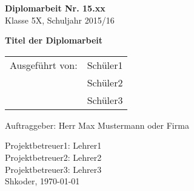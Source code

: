 
\newcommand{\trtitle}{Titel der Diplomarbeit}
\newcommand{\trort}{Shkoder}
\newcommand{\trbetreuer}{Titel Betreuer}
\newcommand{\trfachgebiet}{SEW, INSY, NWTK, ...}
\newcommand{\trdate}{\today}
\newcommand{\trnumber}{15.xx}
\newcommand{\trclass}{5X}
\newcommand{\trschuelereins}{Sch\"uler1}
\newcommand{\trschuelerzwei}{Sch\"uler2}
\newcommand{\trschuelerdrei}{Sch\"uler3}
\newcommand{\trsauftraggeber}{Herr Max Mustermann oder Firma}
\newcommand{\trbetreuereins}{Lehrer1}
\newcommand{\trbetreuerzwei}{Lehrer2}
\newcommand{\trbetreuerdrei}{Lehrer3}

\thispagestyle{empty}

\vspace{2.5cm}
\begin{flushleft}
\textbf{\LARGE Diplomarbeit Nr. \trnumber} \\
\LARGE Klasse \trclass{}, Schuljahr 2015/16

\vspace{9.5cm}
\textbf{\LARGE \trtitle}

\vspace{0.5cm}
\begin{table}[htbp]
\Large
\begin{tabular}{cc}
   Ausgef\"uhrt von: & \trschuelereins \\ 
   & \trschuelerzwei \\ 
   & \trschuelerdrei \\ 
 \end{tabular}
\end{table}
\end{flushleft}

\vspace{0.4cm}
\Large Auftraggeber: \trsauftraggeber

\vspace{0.4cm}
\large Projektbetreuer1: \trbetreuereins \\
\large Projektbetreuer2: \trbetreuerzwei \\
\large Projektbetreuer3: \trbetreuerdrei \\
\newline
\large \trort{}, \today 

\vfill
